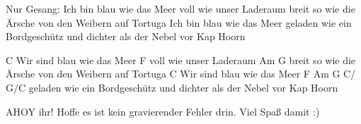 Nur Gesang:
Ich bin blau wie das Meer
voll wie unser Laderaum
breit so wie die Ärsche von den Weibern auf Tortuga
Ich bin blau wie das Meer
geladen wie ein Bordgeschütz und dichter als der Nebel vor Kap Hoorn

C
Wir sind blau wie das Meer
F
voll wie unser Laderaum
Am                              G
breit so wie die Ärsche von den Weibern auf Tortuga
C
Wir sind blau wie das Meer
F                                Am              G             C/   G/C
geladen wie ein Bordgeschütz und dichter als der Nebel vor Kap Hoorn


AHOY ihr! Hoffe es ist kein gravierender Fehler drin. Viel Spaß damit :)
